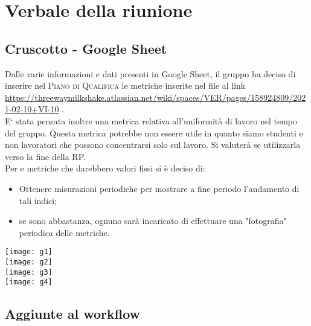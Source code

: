 \section{Verbale della riunione}

	\subsection{Cruscotto - Google Sheet}
	Dalle varie informazioni e dati presenti in Google Sheet, il gruppo ha deciso di inserire nel \textsc{Piano di Qualifica} le metriche inserite nel file al link  \url{https://threewaymilkshake.atlassian.net/wiki/spaces/VER/pages/158924809/2021-02-10+VI-10} .
\\	E` stata pensata inoltre una metrica relativa all'uniformità di lavoro nel tempo del gruppo. Questa metrica potrebbe non essere utile in quanto siamo studenti e non lavoratori che possono concentrarsi solo sul lavoro. Si valuterà se utilizzarla verso la fine della RP.\\
Per e metriche che darebbero valori fissi si è deciso di:
\begin{itemize}
	\item Ottenere misurazioni periodiche per mostrare a fine periodo l'andamento di tali indici;
	\item se sono abbastanza, ognuno sarà incaricato di effettuare una "fotografia" periodica delle metriche.
\end{itemize}
\begin{center}
	\texttt{[image: g1]}\\
	\texttt{[image: g2]}\\
	\texttt{[image: g3]}\\
	\texttt{[image: g4]}\\
\end{center}

	
	\subsection{Aggiunte al workflow}
